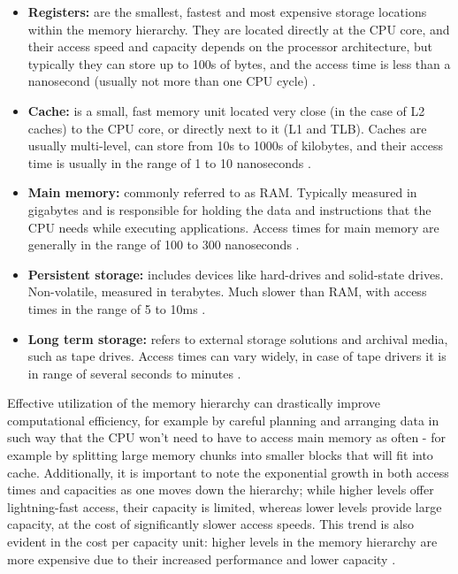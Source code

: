 \begin{itemize}
	\item \textbf{Registers:} are the smallest, fastest and most expensive storage locations within the memory hierarchy. They are located directly at the CPU core, and their access speed and capacity depends on the processor
		architecture, but typically they can store up to 100s of bytes, and the access time is less than a nanosecond (usually not more than one CPU cycle) \cite{whatevery}.
	\item \textbf{Cache:} is a small, fast memory unit located very close (in the case of L2 caches) to the CPU core, or directly next to it (L1 and TLB). Caches are usually multi-level,
		can store from 10s to 1000s of kilobytes, and their access time is usually in the range of 1 to 10 nanoseconds \cite{whatevery, Patterson2013}.
	\item \textbf{Main memory:} commonly referred to as RAM. Typically measured in gigabytes and is responsible for holding the data and instructions that the CPU needs while executing
		applications. Access times for main memory are generally in the range of 100 to 300 nanoseconds \cite{whatevery, Hamacher2011}.
	\item \textbf{Persistent storage:} includes devices like hard-drives and solid-state drives. Non-volatile, measured in terabytes. Much slower than RAM, with access times in the range of 5 to 10ms \cite{hddssdspeeds}.
	\item \textbf{Long term storage:} refers to external storage solutions and archival media, such as tape drives. Access times can vary widely, in case of tape drivers it is in range of several
		seconds to minutes \cite{tapetimesspeed}.
\end{itemize}

\noindent Effective utilization of the memory hierarchy can drastically improve computational efficiency, for example by careful planning and arranging data in such way that the
CPU won't need to have to access main memory as often - for example by splitting large memory chunks into smaller blocks that will fit into cache.
Additionally, it is important to note the exponential growth in both access times and capacities as one moves down the hierarchy; while higher levels offer lightning-fast access,
their capacity is limited, whereas lower levels provide large capacity, at the cost of significantly slower access speeds. This trend is also evident in the cost per capacity unit:
higher levels in the memory hierarchy are more expensive due to their increased performance and lower capacity \cite{comparchaquant}.


